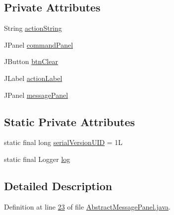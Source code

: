 \subsection*{Private Attributes}
\begin{DoxyCompactItemize}
\item 
String \hyperlink{classcom_1_1poly_1_1nlp_1_1filekommander_1_1views_1_1panels_1_1_abstract_message_panel_a295643f08d4ad315ef3fa316d304dd27}{action\-String}
\item 
J\-Panel \hyperlink{classcom_1_1poly_1_1nlp_1_1filekommander_1_1views_1_1panels_1_1_abstract_message_panel_aa43af4d88699d2fe9fe0c52a8b1d250c}{command\-Panel}
\item 
J\-Button \hyperlink{classcom_1_1poly_1_1nlp_1_1filekommander_1_1views_1_1panels_1_1_abstract_message_panel_af85293e132ba96e5c707b39c418260c3}{btn\-Clear}
\item 
J\-Label \hyperlink{classcom_1_1poly_1_1nlp_1_1filekommander_1_1views_1_1panels_1_1_abstract_message_panel_a1942c7082090f64dafda75c91d7d8f3e}{action\-Label}
\item 
J\-Panel \hyperlink{classcom_1_1poly_1_1nlp_1_1filekommander_1_1views_1_1panels_1_1_abstract_message_panel_a5f778cbc2ed9dd8c37928dbe1412a0b0}{message\-Panel}
\end{DoxyCompactItemize}
\subsection*{Static Private Attributes}
\begin{DoxyCompactItemize}
\item 
static final long \hyperlink{classcom_1_1poly_1_1nlp_1_1filekommander_1_1views_1_1panels_1_1_abstract_message_panel_a865c3834ea52d557283acefd0d2c855c}{serial\-Version\-U\-I\-D} = 1\-L
\item 
static final Logger \hyperlink{classcom_1_1poly_1_1nlp_1_1filekommander_1_1views_1_1panels_1_1_abstract_message_panel_a8f8836218e523baaab4c65c0bc9b1f7e}{log}
\end{DoxyCompactItemize}


\subsection{Detailed Description}


Definition at line \hyperlink{L23}{23} of file \hyperlink{}{Abstract\-Message\-Panel.\-java}.



